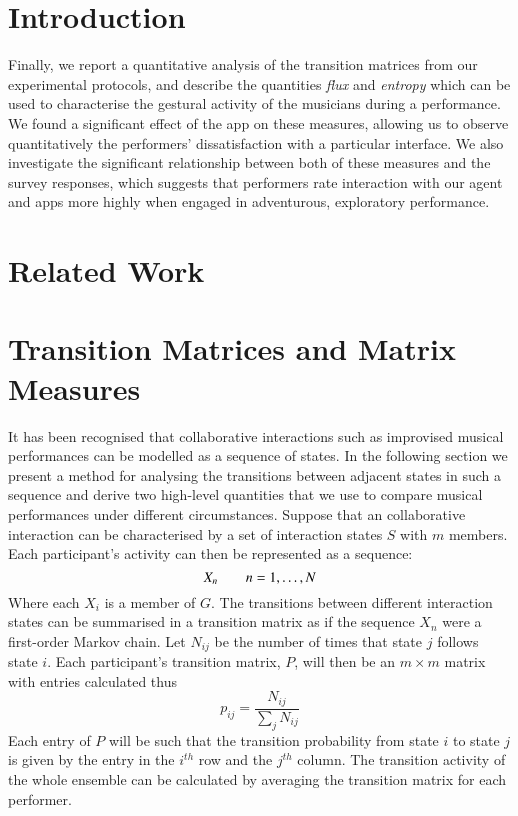 \documentclass{sigchi}
\begin{document}

\section{Introduction}



Finally, we report a quantitative analysis of the transition matrices
from our experimental protocols, and describe the quantities
\emph{flux} and \emph{entropy} which can be used to characterise the
gestural activity of the musicians during a performance. We found a
significant effect of the app on these measures, allowing us to
observe quantitatively the performers' dissatisfaction with a
particular interface. We also investigate the significant relationship
between both of these measures and the survey responses, which
suggests that performers rate interaction with our agent and apps more
highly when engaged in adventurous, exploratory performance.

\section{Related Work}

\section{Transition Matrices and Matrix Measures}

It has been recognised that collaborative interactions such as
improvised musical performances can be modelled as a sequence of
states. In the following section we present a method for analysing the
transitions between adjacent states in such a sequence and derive two
high-level quantities that we use to compare musical performances
under different circumstances. Suppose that an collaborative
interaction can be characterised by a set of interaction states $S$
with $m$ members.
Each participant's activity can then be represented as a sequence:
\begin{equation}
 X_n \hskip 2em n = 1, \ldots, N
\end{equation}
Where each $X_i$ is a member of $G$. The transitions between different
interaction states can be summarised in a transition matrix as if the
sequence $X_n$ were a first-order Markov chain. Let $N_{ij}$ be the
number of times that state $j$ follows state $i$. Each participant's
transition matrix, $P$, will then be an $m \times m$ matrix with
entries calculated thus
\begin{equation}
  p_{ij} = \frac{N_{ij}}{\sum_j N_{ij}}
\end{equation}
Each entry of $P$ will be such that the transition probability from
state $i$ to state $j$ is given by the entry in the $i^{th}$ row and
the $j^{th}$ column. The transition activity of the whole ensemble can
be calculated by averaging the transition matrix for each performer.
\end{document}

